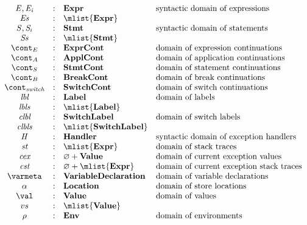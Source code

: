 \documentclass[a4paper,oneside]{article}
\renewcommand{\emptyset}{\varnothing}
\begin{document}
\newcommand{\dlbl}{\mathbf{Label}}
\newcommand{\dclbl}{\mathbf{SwitchLabel}}

\newcommand{\denv}{\mathbf{Env}}

\newcommand{\dval}{\mathbf{Value}}
\newcommand{\dvardecl}{\mathbf{VariableDeclaration}}
\newcommand{\dstring}{\mathbf{StringValue}}
\newcommand{\dfunval}{\mathbf{FunctionValue}}
\newcommand{\dlitval}{\mathbf{LiteralValue}}
\newcommand{\dobjval}{\mathbf{ObjectValue}}

\newcommand{\dclass}{\mathbf{Class}}
\newcommand{\dformals}{\mathbf{Formals}}
\[
  \begin{array}{ccll}
    \expr, \expri{i}
    & : & \dexpr & \text{syntactic domain of expressions}\\
    \exprs
    & : & \mlist{\dexpr}\\

    \stmt, \stmti{i}
    & : & \dstmt & \text{syntactic domain of statements}\\
    \stmts
    & : & \mlist{\dstmt}  & \text{}\\

    \econt
    & : & \decont & \text{domain of expression continuations}\\
    \acont
    & : & \dacont & \text{domain of application continuations}\\
    \scont
    & : & \dscont & \text{domain of statement continuations}\\
    \bcont
    & : & \dbcont & \text{domain of break continuations}\\
    \switchcont
    & : & \dswitchcont & \text{domain of switch continuations}\\

    \lbl & : & \dlbl & \text{domain of labels}\\
    \lbls & : & \mlist{\dlbl} \\
    \clbl & : & \dclbl & \text{domain of switch labels}\\
    \clbls & : & \mlist{\dclbl} \\

    \handler
    & : & \dhandler & \text{syntactic domain of exception handlers} \\
    \strace
    & : & \mlist{\dexpr} & \text{domain of stack traces}\\
    \cex
    & : &  \emptyset + \dval & \text{domain of current exception values}\\
    \cstrace
    & : & \emptyset + \mlist{\dexpr} & \text{domain of current exception stack traces}\\

    \varmeta
    & : & \dvardecl & \text{domain of variable declarations}\\
    \loc
    & : & \dlocation & \text{domain of store locations}\\
    \val
    & : & \dval & \text{domain of values}\\
    \vals
    & : & \mlist{\dval}\\
    \env
    & : & \denv & \text{domain of environments}\\
  \end{array}
\]
\end{document}

